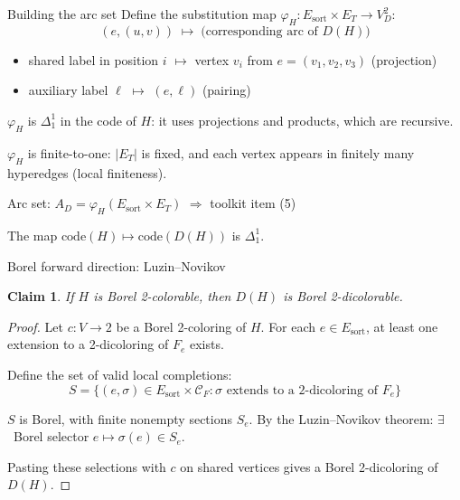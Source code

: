 \documentclass[aspectratio=169, 12pt]{beamer}
\newtheorem{claim}[theorem]{Claim}
\newcommand{\CF}{\mathcal{C}_F}
\begin{document}
\begin{frame}{Building the arc set}
Define the \alert{substitution map} $\varphi_H\colon E_{\mathrm{sort}} \times E_T \to V_D^2$:
$$
(e, (u,v)) \;\longmapsto\; \text{(corresponding arc of $D(H)$)}
$$
\begin{itemize}
	\item shared label in position $i$ $\mapsto$ vertex $v_i$ from $e = (v_1,v_2,v_3)$ \quad (projection)
	\item auxiliary label $\ell$ $\mapsto$ $(e, \ell)$ \quad (pairing)
\end{itemize}

\pause
\medskip

$\varphi_H$ is $\Delta^1_1$ in the code of $H$: it uses projections and products, which are recursive.

\medskip

$\varphi_H$ is \alert{finite-to-one}: $|E_T|$ is fixed, and each vertex appears in finitely many hyperedges (local finiteness).

\medskip

Arc set: $A_D = \varphi_H(E_{\mathrm{sort}} \times E_T)$ \hfill $\Rightarrow$ toolkit item (5) \checkmark

\pause
\bigskip

\begin{lemma}
The map $\mathrm{code}(H) \mapsto \mathrm{code}(D(H))$ is $\Delta^1_1$.
\end{lemma}
\end{frame}

\begin{frame}{Borel forward direction: Luzin--Novikov}
\begin{claim}
If $H$ is Borel 2-colorable, then $D(H)$ is Borel 2-dicolorable.
\end{claim}

\pause

\begin{proof}
Let $c\colon V \to 2$ be a Borel 2-coloring of $H$.
For each $e \in E_{\mathrm{sort}}$, at least one extension to a 2-dicoloring of $F_e$ exists.

\medskip

Define the set of valid local completions:
$$
S = \{(e, \sigma) \in E_{\mathrm{sort}} \times \CF : \sigma \text{ extends to a 2-dicoloring of } F_e\}
$$

$S$ is Borel, with \alert{finite} nonempty sections $S_e$.
By the \alert{Luzin--Novikov theorem}: $\exists$~Borel selector $e \mapsto \sigma(e) \in S_e$.

\medskip

Pasting these selections with $c$ on shared vertices gives a Borel 2-dicoloring of $D(H)$.
\end{proof}
\end{frame}
\end{document}
